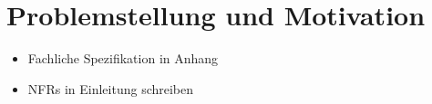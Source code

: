 \section{Problemstellung und Motivation}
\begin{itemize}
	\item Fachliche Spezifikation in Anhang
	\item NFRs in Einleitung schreiben
\end{itemize}







